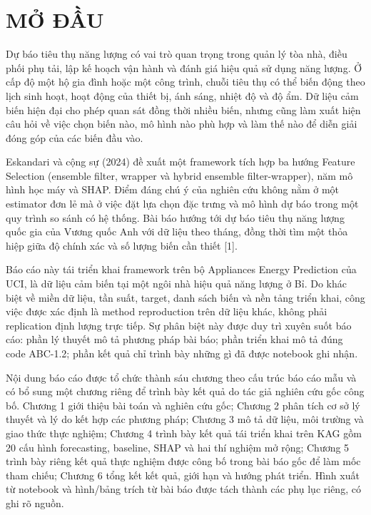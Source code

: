 \chapter*{MỞ ĐẦU}
\label{chap:mo-dau}

Dự báo tiêu thụ năng lượng có vai trò quan trọng trong quản lý tòa nhà, điều phối phụ tải, lập kế hoạch vận hành và đánh giá hiệu quả sử dụng năng lượng. Ở cấp độ một hộ gia đình hoặc một công trình, chuỗi tiêu thụ có thể biến động theo lịch sinh hoạt, hoạt động của thiết bị, ánh sáng, nhiệt độ và độ ẩm. Dữ liệu cảm biến hiện đại cho phép quan sát đồng thời nhiều biến, nhưng cũng làm xuất hiện câu hỏi về việc chọn biến nào, mô hình nào phù hợp và làm thế nào để diễn giải đóng góp của các biến đầu vào.

Eskandari và cộng sự (2024) đề xuất một framework tích hợp ba hướng Feature Selection (ensemble filter, wrapper và hybrid ensemble filter-wrapper), năm mô hình học máy và SHAP. Điểm đáng chú ý của nghiên cứu không nằm ở một estimator đơn lẻ mà ở việc đặt lựa chọn đặc trưng và mô hình dự báo trong một quy trình so sánh có hệ thống. Bài báo hướng tới dự báo tiêu thụ năng lượng quốc gia của Vương quốc Anh với dữ liệu theo tháng, đồng thời tìm một thỏa hiệp giữa độ chính xác và số lượng biến cần thiết {[}1{]}.

Báo cáo này tái triển khai framework trên bộ Appliances Energy Prediction của UCI, là dữ liệu cảm biến tại một ngôi nhà hiệu quả năng lượng ở Bỉ. Do khác biệt về miền dữ liệu, tần suất, target, danh sách biến và nền tảng triển khai, công việc được xác định là method reproduction trên dữ liệu khác, không phải replication định lượng trực tiếp. Sự phân biệt này được duy trì xuyên suốt báo cáo: phần lý thuyết mô tả phương pháp bài báo; phần triển khai mô tả đúng code ABC-1.2; phần kết quả chỉ trình bày những gì đã được notebook ghi nhận.

Nội dung báo cáo được tổ chức thành sáu chương theo cấu trúc báo cáo mẫu và có bổ sung một chương riêng để trình bày kết quả do tác giả nghiên cứu gốc công bố. Chương 1 giới thiệu bài toán và nghiên cứu gốc; Chương 2 phân tích cơ sở lý thuyết và lý do kết hợp các phương pháp; Chương 3 mô tả dữ liệu, môi trường và giao thức thực nghiệm; Chương 4 trình bày kết quả tái triển khai trên KAG gồm 20 cấu hình forecasting, baseline, SHAP và hai thí nghiệm mở rộng; Chương 5 trình bày riêng kết quả thực nghiệm được công bố trong bài báo gốc để làm mốc tham chiếu; Chương 6 tổng kết kết quả, giới hạn và hướng phát triển. Hình xuất từ notebook và hình/bảng trích từ bài báo được tách thành các phụ lục riêng, có ghi rõ nguồn.
